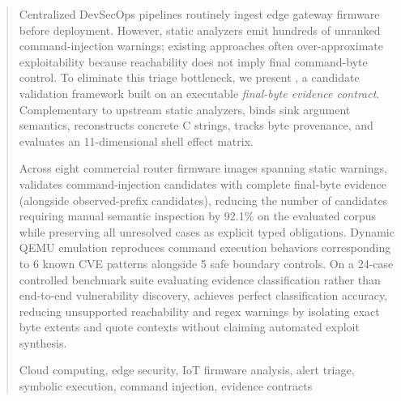 \begin{abstract}
Centralized DevSecOps pipelines routinely ingest edge gateway firmware before deployment. However, static analyzers emit hundreds of unranked command-injection warnings; existing approaches often over-approximate exploitability because reachability does not imply final command-byte control. To eliminate this triage bottleneck, we present \tool, a candidate validation framework built on an executable \emph{final-byte evidence contract}. Complementary to upstream static analyzers, \tool binds sink argument semantics, reconstructs concrete C strings, tracks byte provenance, and evaluates an 11-dimensional shell effect matrix.

Across eight commercial router firmware images spanning \TSDSReviewCampaignRecords{} static warnings, \tool validates \TSDSReviewCampaignCompleteDirect{} command-injection candidates with complete final-byte evidence (alongside \TSDSReviewCampaignObservedPrefixDirect{} observed-prefix candidates), reducing the number of candidates requiring manual semantic inspection by 92.1\% on the evaluated corpus while preserving all \TSDSReviewCampaignResidual{} unresolved cases as explicit typed obligations. Dynamic QEMU emulation reproduces command execution behaviors corresponding to 6 known CVE patterns alongside 5 safe boundary controls. On a 24-case controlled benchmark suite evaluating evidence classification rather than end-to-end vulnerability discovery, \tool achieves perfect classification accuracy, reducing unsupported reachability and regex warnings by isolating exact byte extents and quote contexts without claiming automated exploit synthesis.

\begin{IEEEkeywords}
Cloud computing, edge security, IoT firmware analysis, alert triage, symbolic execution, command injection, evidence contracts
\end{IEEEkeywords}
\end{abstract}
